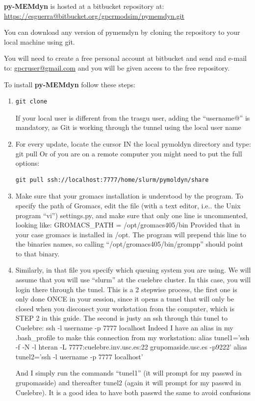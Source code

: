 \documentclass[10pt, oneside, pdftex]{article}
\begin{document}
\textbf{py-MEMdyn} is hosted at a bitbucket repository at:
\url{https://esguerra@bitbucket.org/gpcrmodsim/pymemdyn.git}

You can download any version  of pymemdyn by cloning the repository to
your local machine using git.

You will need to create a  free personal account at bitbucket and send
and e-mail to: \url{gpcruser@gmail.com} and  you will be given access 
to the free repository.

To install \textbf{py-MEMdyn} follow these steps:
\begin{enumerate}
\item{
\begin{Verbatim}
git clone 
\end{Verbatim}
If your  local  user  is  different  from the  trasgu  user,  adding  the
``username@'' is mandatory,  as Git is working through  the tunnel using
the local user name}

\item{For every update, locate the cursor IN the local pymoldyn directory
and type: git pull  Or of you are on a remote  computer you might need
to       put       the        full       options:
\begin{Verbatim}
git pull ssh://localhost:7777/home/slurm/pymoldyn/share
\end{Verbatim}
}

\item{Make sure  that your  gromacs installation  is understood  by the
program. To  specify the path of  Gromacs, edit the file  (with a text
editor, i.e.. the  Unix program ``vi'') settings.py, and  make sure that
only   one  line   is  uncommented,   looking  like:   GROMACS\_PATH  =
/opt/gromacs405/bin Provided that in your case gromacs is installed in
/opt. The  program will  prepend this line  to the binaries  names, so
calling ``/opt/gromacs405/bin/grompp'' should point to that binary.}

\item{Similarly,  in that file you  specify which queuing  system you are
using.  We will  assume  that you  will  use ``slurm''  at the  cuelebre
cluster. In this case, you will login there through the tunel. This is
a 2 stepwise process, the first one is only done ONCE in your session,
since it  opens a tunel  that will only  be closed when  you disconect
your workstation from the computer, which is STEP 2 in this guide. The
second is justy an ssh through this tunel to Cuelebre: ssh -l username
-p 7777 localhost  Indeed I have an alias in  my .bash\_profile to make
this connection from my workstation: alias tunel1='ssh -f -N -l hteran
-L   7777:cuelebre.inv.usc.es:22   grupomaside.usc.es  -p9222'   alias
tunel2='ssh -l username -p 7777 localhost'

And I simply  run the commands ``tunel1'' (it will  prompt for my passwd
in grupomaside)  and thereafter  tunel2 (again it  will prompt  for my
passwd in Cuelebre). It is a good idea to have both passwd the same to
avoid confusions}
\end{enumerate}
\end{document}
